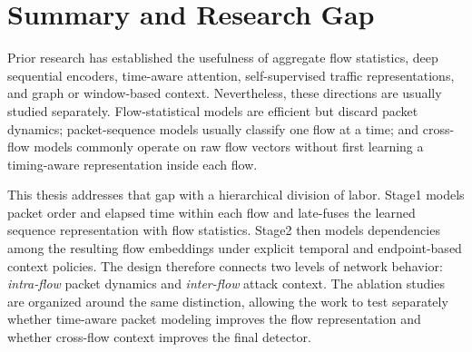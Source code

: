 \documentclass[11pt,fleqn]{report}
\begin{document}

\section{Summary and Research Gap}
\label{subsec:rw_gap}

Prior research has established the usefulness of aggregate flow statistics,
deep sequential encoders, time-aware attention, self-supervised traffic
representations, and graph or window-based context. Nevertheless, these
directions are usually studied separately. Flow-statistical models are
efficient but discard packet dynamics; packet-sequence models usually classify
one flow at a time; and cross-flow models commonly operate on raw flow vectors
without first learning a timing-aware representation inside each flow.

This thesis addresses that gap with a hierarchical division of labor. Stage1
models packet order and elapsed time within each flow and late-fuses the learned
sequence representation with flow statistics. Stage2 then models dependencies
among the resulting flow embeddings under explicit temporal and endpoint-based
context policies. The design therefore connects two levels of network behavior:
\emph{intra-flow} packet dynamics and \emph{inter-flow} attack context. The
ablation studies are organized around the same distinction, allowing the work
to test separately whether time-aware packet modeling improves the flow
representation and whether cross-flow context improves the final detector.


\end{document}
